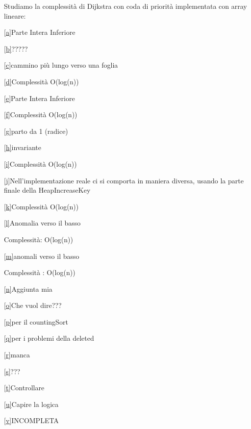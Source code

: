 \documentclass{article}
\begin{document}
{Studiamo la complessità di Dijkstra con coda di priorità implementata
con array lineare:}

{}

{}

{}

\protect\hyperlink{cmnt_ref1}{{[}a{]}}{Parte Intera Inferiore}

\protect\hyperlink{cmnt_ref2}{{[}b{]}}{?????}

\protect\hyperlink{cmnt_ref3}{{[}c{]}}{cammino più lungo verso una
foglia}

\protect\hyperlink{cmnt_ref4}{{[}d{]}}{Complessità O(log(n))}

\protect\hyperlink{cmnt_ref5}{{[}e{]}}{Parte Intera Inferiore}

\protect\hyperlink{cmnt_ref6}{{[}f{]}}{Complessità O(log(n))}

\protect\hyperlink{cmnt_ref7}{{[}g{]}}{parto da 1 (radice)}

\protect\hyperlink{cmnt_ref8}{{[}h{]}}{invariante}

\protect\hyperlink{cmnt_ref9}{{[}i{]}}{Complessità O(log(n))}

\protect\hyperlink{cmnt_ref10}{{[}j{]}}{Nell'implementazione reale ci si
comporta in maniera diversa, usando la parte finale della
HeapIncreaseKey}

\protect\hyperlink{cmnt_ref11}{{[}k{]}}{Complessità O(log(n))}

\protect\hyperlink{cmnt_ref12}{{[}l{]}}{Anomalia verso il basso}

{Complessità: O(log(n))}

\protect\hyperlink{cmnt_ref13}{{[}m{]}}{anomali verso il basso}

{Complessità : O(log(n))}

\protect\hyperlink{cmnt_ref14}{{[}n{]}}{Aggiunta mia}

\protect\hyperlink{cmnt_ref15}{{[}o{]}}{Che vuol dire???}

\protect\hyperlink{cmnt_ref16}{{[}p{]}}{per il countingSort}

\protect\hyperlink{cmnt_ref17}{{[}q{]}}{per i problemi della deleted}

\protect\hyperlink{cmnt_ref18}{{[}r{]}}{manca}

\protect\hyperlink{cmnt_ref19}{{[}s{]}}{???}

\protect\hyperlink{cmnt_ref20}{{[}t{]}}{Controllare}

\protect\hyperlink{cmnt_ref21}{{[}u{]}}{Capire la logica}

\protect\hyperlink{cmnt_ref22}{{[}v{]}}{INCOMPLETA}
\end{document}
